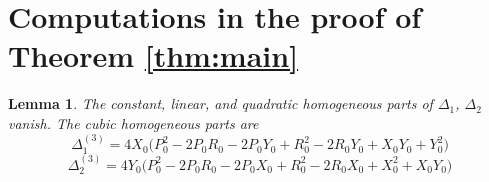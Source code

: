 \documentclass{article}
\theoremstyle{plain}
\theoremstyle{definition}
\theoremstyle{plain}
\theoremstyle{plain}
\theoremstyle{plain}
\newtheorem{lemma}[theorem]{Lemma}
\theoremstyle{remark}
\theoremstyle{remark}
\theoremstyle{plain}
\theoremstyle{plain}
\newcounter{main}
\theoremstyle{plain}
\theoremstyle{plain}
\begin{document}
\appendix

\section{Computations in the proof of Theorem \ref{thm:main}}

\begin{lemma}\label{lma:discriminantterms}
The constant, linear, and quadratic homogeneous parts of $\Delta_1$, $\Delta_2$ vanish. The cubic homogeneous parts are
\begin{equation*}
	\Delta_1^{(3)} = 4X_0\bigl(P_0^2 - 2P_0R_0 - 2P_0Y_0 + R_0^2 - 2R_0Y_0 + X_0Y_0 + Y_0^2\bigr)
\end{equation*}
\begin{equation*}
	\Delta_2^{(3)} = 4Y_0\bigl(P_0^2 - 2P_0R_0 - 2P_0X_0 + R_0^2 - 2R_0X_0 + X_0^2 + X_0Y_0\bigr)
\end{equation*}
\end{lemma}
\end{document}
